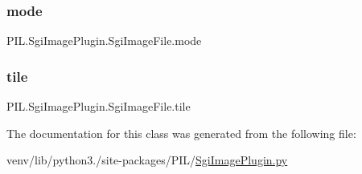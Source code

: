 \subsubsection{\texorpdfstring{mode}{mode}}
{\footnotesize\ttfamily P\+I\+L.\+Sgi\+Image\+Plugin.\+Sgi\+Image\+File.\+mode}

\mbox{\label{classPIL_1_1SgiImagePlugin_1_1SgiImageFile_a4357af2d8b3a4fa1d9188d613e11496c}} 
\subsubsection{\texorpdfstring{tile}{tile}}
{\footnotesize\ttfamily P\+I\+L.\+Sgi\+Image\+Plugin.\+Sgi\+Image\+File.\+tile}



The documentation for this class was generated from the following file\+:\begin{DoxyCompactItemize}
\item 
venv/lib/python3./site-\/packages/\+P\+I\+L/\hyperlink{SgiImagePlugin_8py}{Sgi\+Image\+Plugin.\+py}\end{DoxyCompactItemize}
